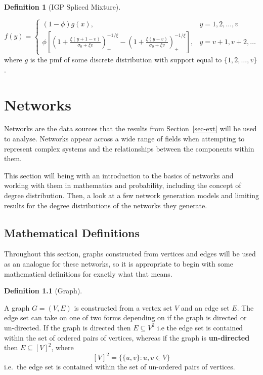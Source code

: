 \documentclass[
  10pt,
  a4paper,
]{scrreprt}
\theoremstyle{plain}
\theoremstyle{plain}
\theoremstyle{definition}
\newtheorem{definition}{Definition}[section]
\theoremstyle{plain}
\theoremstyle{remark}
\begin{document}
{\begin{definition}[IGP Spliced
Mixture]\protect\hypertarget{def-mixigp}{}\label{def-mixigp}

\[
f(y) = \begin{cases}
(1-\phi)g(x), & y=1,2,\ldots, v\\
\phi\left[\left(1+\displaystyle\frac{\xi(y+1-v)}{\sigma_0+\xi v}\right)_+^{-1/\xi}-\left(1+\displaystyle\frac{\xi(y-v)}{\sigma_0+\xi v}\right)_+^{-1/\xi}\right],&y=v+1, v+2,\ldots
\end{cases}
\] where \(g\) is the pmf of some discrete distribution with support
equal to \(\{1,2,\ldots,v\}\).

\end{definition}

\hypertarget{sec-net}{%
\chapter{Networks}\label{sec-net}}

Networks are the data sources that the results from
Section~\ref{sec-ext} will be used to analyse. Networks appear across a
wide range of fields when attempting to represent complex systems and
the relationships between the components within them.

This section will being with an introduction to the basics of networks
and working with them in mathematics and probability, including the
concept of degree distribution. Then, a look at a few network generation
models and limiting results for the degree distributions of the networks
they generate.

\hypertarget{mathematical-definitions}{%
\section{Mathematical Definitions}\label{mathematical-definitions}}

Throughout this section, graphs constructed from vertices and edges will
be used as an analogue for these networks, so it is appropriate to begin
with some mathematical definitions for exactly what that means.

\begin{definition}[Graph]\protect\hypertarget{def-net}{}\label{def-net}

A graph \(G = (V,E)\) is constructed from a vertex set \(V\) and an edge
set \(E\). The edge set can take on one of two forms depending on if the
graph is directed or un-directed. If the graph is directed then
\(E\subseteq V^2\) i.e the edge set is contained within the set of
ordered pairs of vertices, whereas if the graph is \textbf{un-directed}
then \(E\subseteq [V]^2\), where \[
[V]^2 = \{\{u,v\}:u,v\in V\}
\] i.e.~the edge set is contained within the set of un-ordered pairs of
vertices.


\end{definition}}
\end{document}

